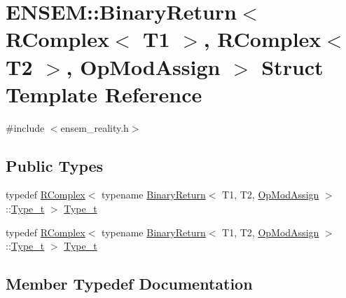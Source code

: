 \hypertarget{structENSEM_1_1BinaryReturn_3_01RComplex_3_01T1_01_4_00_01RComplex_3_01T2_01_4_00_01OpModAssign_01_4}{}\section{E\+N\+S\+EM\+:\+:Binary\+Return$<$ R\+Complex$<$ T1 $>$, R\+Complex$<$ T2 $>$, Op\+Mod\+Assign $>$ Struct Template Reference}
\label{structENSEM_1_1BinaryReturn_3_01RComplex_3_01T1_01_4_00_01RComplex_3_01T2_01_4_00_01OpModAssign_01_4}


{\ttfamily \#include $<$ensem\+\_\+reality.\+h$>$}

\subsection*{Public Types}
\begin{DoxyCompactItemize}
\item 
typedef \mbox{\hyperlink{classENSEM_1_1RComplex}{R\+Complex}}$<$ typename \mbox{\hyperlink{structENSEM_1_1BinaryReturn}{Binary\+Return}}$<$ T1, T2, \mbox{\hyperlink{structENSEM_1_1OpModAssign}{Op\+Mod\+Assign}} $>$\+::\mbox{\hyperlink{structENSEM_1_1BinaryReturn_3_01RComplex_3_01T1_01_4_00_01RComplex_3_01T2_01_4_00_01OpModAssign_01_4_a80b31011890b63af6d1a5b429a9d9091}{Type\+\_\+t}} $>$ \mbox{\hyperlink{structENSEM_1_1BinaryReturn_3_01RComplex_3_01T1_01_4_00_01RComplex_3_01T2_01_4_00_01OpModAssign_01_4_a80b31011890b63af6d1a5b429a9d9091}{Type\+\_\+t}}
\item 
typedef \mbox{\hyperlink{classENSEM_1_1RComplex}{R\+Complex}}$<$ typename \mbox{\hyperlink{structENSEM_1_1BinaryReturn}{Binary\+Return}}$<$ T1, T2, \mbox{\hyperlink{structENSEM_1_1OpModAssign}{Op\+Mod\+Assign}} $>$\+::\mbox{\hyperlink{structENSEM_1_1BinaryReturn_3_01RComplex_3_01T1_01_4_00_01RComplex_3_01T2_01_4_00_01OpModAssign_01_4_a80b31011890b63af6d1a5b429a9d9091}{Type\+\_\+t}} $>$ \mbox{\hyperlink{structENSEM_1_1BinaryReturn_3_01RComplex_3_01T1_01_4_00_01RComplex_3_01T2_01_4_00_01OpModAssign_01_4_a80b31011890b63af6d1a5b429a9d9091}{Type\+\_\+t}}
\end{DoxyCompactItemize}


\subsection{Member Typedef Documentation}
\mbox{\label{structENSEM_1_1BinaryReturn_3_01RComplex_3_01T1_01_4_00_01RComplex_3_01T2_01_4_00_01OpModAssign_01_4_a80b31011890b63af6d1a5b429a9d9091}} 
